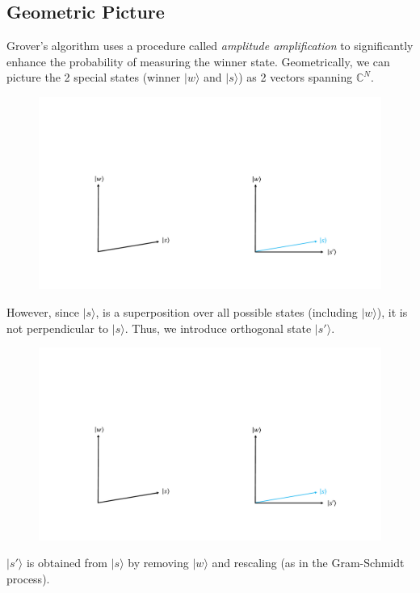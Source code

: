 \documentclass[11pt]{article} %
\begin{document}
\subsection{Geometric Picture}
Grover's algorithm uses a procedure called \textit{amplitude amplification} to significantly enhance the probability of measuring the winner state. Geometrically, we can picture the 2 special states (winner $|w\rangle$ and $|s\rangle$) as 2 vectors spanning $\mathbb{C}^N$.
\begin{figure}[h!]
    \centering
    \includegraphics[width=.3\textwidth]{Lecture7Figs/sw.pdf}
    \label{fig:search_item}
\end{figure}
\newline
However, since $|s\rangle$, is a superposition over all possible states (including $|w\rangle$), it is not perpendicular to $|s\rangle$. Thus, we introduce orthogonal state $|s'\rangle$.
\begin{figure}[h!]
    \centering
    \includegraphics[width=.3\textwidth]{Lecture7Figs/ss'w.pdf}
    \label{fig:search_item}
\end{figure}
$|s'\rangle$ is obtained from $|s\rangle$ by removing $|w\rangle$ and rescaling (as in the Gram-Schmidt process).
\end{document}
